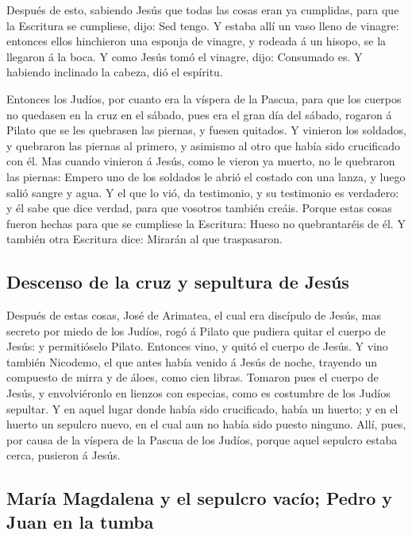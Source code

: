  Después de esto, sabiendo Jesús que todas las cosas eran
ya cumplidas, para que la Escritura se cumpliese, dijo: Sed tengo.
 Y estaba allí un vaso lleno de vinagre: entonces ellos
hinchieron una esponja de vinagre, y rodeada á un hisopo, se la llegaron
á la boca.  Y como Jesús tomó el vinagre, dijo: Consumado
es. Y habiendo inclinado la cabeza, dió el espíritu.

 Entonces los Judíos, por cuanto era la víspera de la
Pascua, para que los cuerpos no quedasen en la cruz en el sábado, pues
era el gran día del sábado, rogaron á Pilato que se les quebrasen las
piernas, y fuesen quitados.  Y vinieron los soldados, y
quebraron las piernas al primero, y asimismo al otro que había sido
crucificado con él.  Mas cuando vinieron á Jesús, como le
vieron ya muerto, no le quebraron las piernas:  Empero uno
de los soldados le abrió el costado con una lanza, y luego salió sangre
y agua.  Y el que lo vió, da testimonio, y su testimonio es
verdadero: y él sabe que dice verdad, para que vosotros también creáis.
 Porque estas cosas fueron hechas para que se cumpliese la
Escritura: Hueso no quebrantaréis de él.  Y también otra
Escritura dice: Mirarán al que traspasaron.

\hypertarget{descenso-de-la-cruz-y-sepultura-de-jesuxfas}{%
\subsection{Descenso de la cruz y sepultura de
Jesús}\label{descenso-de-la-cruz-y-sepultura-de-jesuxfas}}

 Después de estas cosas, José de Arimatea, el cual era
discípulo de Jesús, mas secreto por miedo de los Judíos, rogó á Pilato
que pudiera quitar el cuerpo de Jesús: y permitióselo Pilato. Entonces
vino, y quitó el cuerpo de Jesús.  Y vino también Nicodemo,
el que antes había venido á Jesús de noche, trayendo un compuesto de
mirra y de áloes, como cien libras.  Tomaron pues el cuerpo
de Jesús, y envolviéronlo en lienzos con especias, como es costumbre de
los Judíos sepultar.  Y en aquel lugar donde había sido
crucificado, había un huerto; y en el huerto un sepulcro nuevo, en el
cual aun no había sido puesto ninguno.  Allí, pues, por
causa de la víspera de la Pascua de los Judíos, porque aquel sepulcro
estaba cerca, pusieron á Jesús.

\hypertarget{maruxeda-magdalena-y-el-sepulcro-vacuxedo-pedro-y-juan-en-la-tumba}{%
\subsection{María Magdalena y el sepulcro vacío; Pedro y Juan en la
tumba}\label{maruxeda-magdalena-y-el-sepulcro-vacuxedo-pedro-y-juan-en-la-tumba}}

